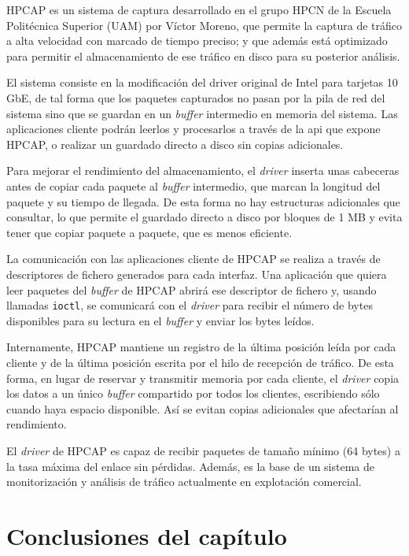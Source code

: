 \documentclass[twoside, 12pt]{epstfg}
\begin{document}
HPCAP \cite{victorPhD} es un sistema de captura desarrollado en el grupo HPCN de la Escuela Politécnica Superior (UAM) por Víctor Moreno, que permite la captura de tráfico a alta velocidad con marcado de tiempo preciso; y que además está optimizado para permitir el almacenamiento de ese tráfico en disco para su posterior análisis.

El sistema consiste en la modificación del \gls{driver} original de Intel para tarjetas 10 GbE, de tal forma que los paquetes capturados no pasan por la pila de red del sistema sino que se guardan en un \textit{buffer} intermedio en memoria del sistema. Las aplicaciones cliente podrán leerlos y procesarlos a través de la \gls{api} que expone HPCAP, o realizar un guardado directo a disco sin copias adicionales.

Para mejorar el rendimiento del almacenamiento, el \textit{driver} inserta unas cabeceras antes de copiar cada paquete al \textit{buffer} intermedio, que marcan la longitud del paquete y su tiempo de llegada. De esta forma no hay estructuras adicionales que consultar, lo que permite el guardado directo a disco por bloques de 1 MB y evita tener que copiar paquete a paquete, que es menos eficiente.

La comunicación con las aplicaciones cliente de HPCAP se realiza a través de descriptores de fichero generados para cada interfaz. Una aplicación que quiera leer paquetes del \textit{buffer} de HPCAP abrirá ese descriptor de fichero y, usando llamadas \texttt{ioctl}, se comunicará con el \textit{driver} para recibir el número de bytes disponibles para su lectura en el \textit{buffer} y enviar los bytes leídos.

Internamente, HPCAP mantiene un registro de la última posición leída por cada cliente y de la última posición escrita por el hilo de recepción de tráfico. De esta forma, en lugar de reservar y transmitir memoria por cada cliente, el \textit{driver} copia los datos a un único \textit{buffer} compartido por todos los clientes, escribiendo sólo cuando haya espacio disponible. Así se evitan copias adicionales que afectarían al rendimiento.

El \textit{driver} de HPCAP es capaz de recibir paquetes de tamaño mínimo (64 bytes) a la tasa máxima del enlace sin pérdidas. Además, es la base de un sistema de monitorización y análisis de tráfico \cite{m3omon} actualmente en explotación comercial.

\section{Conclusiones del capítulo}
\end{document}
